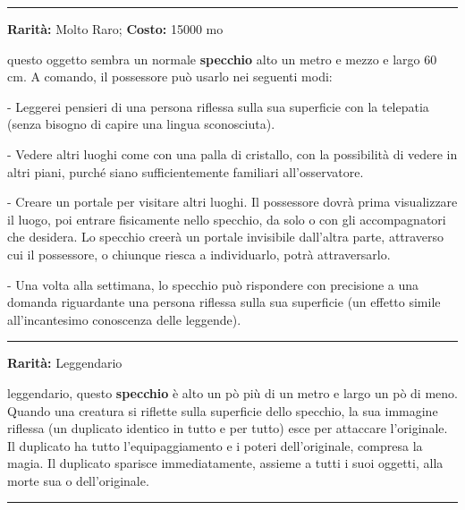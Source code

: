 \begin{multicols}{2}
\smallskip\noindent\rule{\linewidth}{2pt}  \hypertarget{Specchiodell'Abilita'mentale}{}\smallskip{}\noindent\label{Specchiodell'Abilita'mentale}

\textbf{Rarità:} Molto Raro; \textbf{Costo:} 15000 mo

questo oggetto sembra un normale \textbf{specchio} alto un metro e mezzo e largo 60 cm. A comando, il possessore può usarlo nei seguenti modi:

- Leggerei pensieri di una persona riflessa sulla sua superficie con la telepatia (senza bisogno di capire una lingua sconosciuta).

- Vedere altri luoghi come con una palla di cristallo, con la possibilità di vedere in altri piani, purché siano sufficientemente familiari all'osservatore.

- Creare un portale per visitare altri luoghi. Il possessore dovrà prima visualizzare il luogo, poi entrare fisicamente nello specchio, da solo o con gli accompagnatori che desidera. Lo specchio creerà un portale invisibile dall'altra parte, attraverso cui il possessore, o chiunque riesca a individuarlo, potrà attraversarlo.

- Una volta alla settimana, lo specchio può rispondere con precisione a una domanda riguardante una persona riflessa sulla sua superficie (un effetto simile all'incantesimo conoscenza delle leggende).

\smallskip\noindent\rule{\linewidth}{2pt}  \hypertarget{SpecchiodellaDuplicazione}{}\smallskip{}\noindent\label{SpecchiodellaDuplicazione}

\textbf{Rarità:} Leggendario

leggendario, questo \textbf{specchio} è alto un pò più di un metro e largo un pò di meno. Quando una creatura si riflette sulla superficie dello specchio, la sua immagine riflessa (un duplicato identico in tutto e per tutto) esce per attaccare l'originale. Il duplicato ha tutto l'equipaggiamento e i poteri dell'originale, compresa la magia. Il duplicato sparisce immediatamente, assieme a tutti i suoi oggetti, alla morte sua o dell'originale.

\smallskip\noindent\rule{\linewidth}{2pt}  \hypertarget{SpecchioIntrappolaVita}{}\smallskip{}\noindent\label{SpecchioIntrappolaVita}


\end{multicols}
